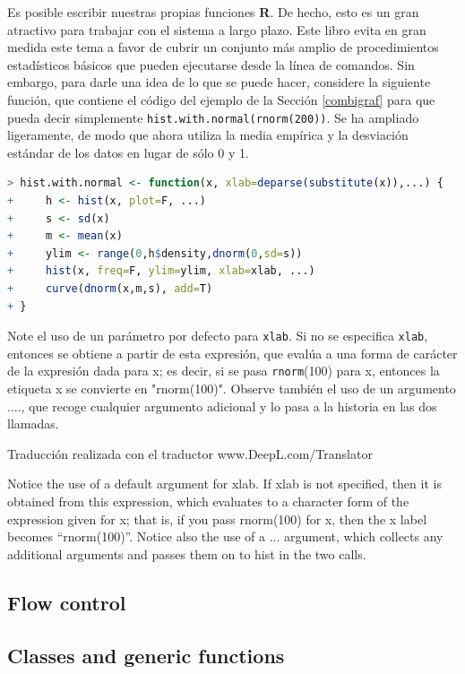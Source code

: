 Es posible escribir nuestras propias funciones \textbf{R}. De hecho, esto es un
gran atractivo para trabajar con el sistema a largo plazo. Este libro evita en
gran medida este tema a favor de cubrir un conjunto más amplio de
procedimientos estadísticos básicos que pueden ejecutarse desde la línea de
comandos. Sin embargo, para darle una idea de lo que se puede hacer, considere
la siguiente función, que contiene el código del ejemplo de la Sección
\ref{combigraf} para que pueda decir simplemente
\texttt{hist.with.normal(rnorm(200))}. Se ha ampliado ligeramente, de modo que
ahora utiliza la media empírica y la desviación estándar de los datos en lugar
de sólo 0 y 1.

\begin{lstlisting}[language=R]
> hist.with.normal <- function(x, xlab=deparse(substitute(x)),...) {
+     h <- hist(x, plot=F, ...)
+     s <- sd(x)
+     m <- mean(x)
+     ylim <- range(0,h$density,dnorm(0,sd=s))
+     hist(x, freq=F, ylim=ylim, xlab=xlab, ...)
+     curve(dnorm(x,m,s), add=T)
+ }
\end{lstlisting}

Note el uso de un parámetro por defecto para \texttt{xlab}. Si no se especifica
\texttt{xlab}, entonces se obtiene a partir de esta expresión, que evalúa a una forma de
carácter de la expresión dada para x; es decir, si se pasa \texttt{rnorm}(100) para x,
entonces la etiqueta x se convierte en "rnorm(100)". Observe también el uso de
un argumento ...., que recoge cualquier argumento adicional y lo pasa a la
historia en las dos llamadas.


Traducción realizada con el traductor www.DeepL.com/Translator

Notice the use of a default argument for xlab. If xlab is not specified, then it is obtained from this expression, which evaluates to a character form of the expression given for x; that is, if you pass rnorm(100) for x, then the x label becomes “rnorm(100)”. Notice also the use of a ...  argument, which collects any additional arguments and passes them on to hist in the two calls.

\newpage
\subsection{Flow control} \label{flowcontrol}
\subsection{Classes and generic functions}


